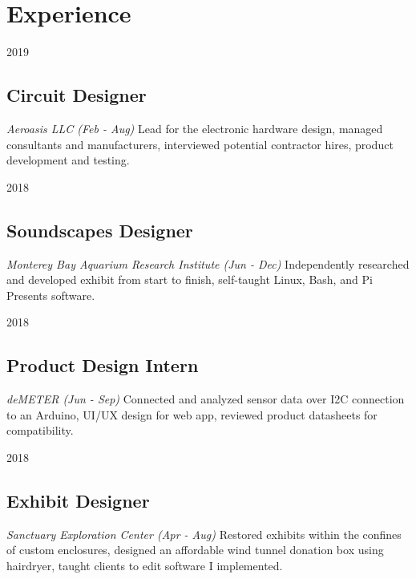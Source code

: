 \documentclass[12pt,letterpaper]{report}
\newcommand{\middlegap}{3.5em}
\newcommand{\verticalgap}{2em}
\newcommand{\leftbody}{0.69\linewidth}
\begin{document}
	\begin{minipage}[t]{\leftbody}
		\vspace{\verticalgap}
	\raggedright
    \section*{Experience}
    \begin{tablist}
    \item[2019] \tab 
    \subsection*{Circuit Designer}
    \textit{Aeroasis LLC (Feb - Aug)} \linebreak 
	Lead for the electronic hardware design, managed consultants and manufacturers, interviewed potential contractor hires, product development and testing.
    \item[2018] \tab
    \subsection*{Soundscapes Designer}
    \textit{Monterey Bay Aquarium Research Institute (Jun - Dec)} \linebreak 
    Independently researched and developed exhibit from start to finish, self-taught Linux, Bash, and Pi Presents software.
    \item[2018] \tab
    \subsection*{Product Design Intern}
    \textit{deMETER (Jun - Sep)} \linebreak 
    Connected and analyzed sensor data over I2C connection to an Arduino, UI/UX design for web app, reviewed product datasheets for compatibility. 
    \item[2018] \tab 
    \subsection*{Exhibit Designer}
	\textit{Sanctuary Exploration Center (Apr - Aug)} \linebreak
	Restored exhibits within the confines of custom enclosures, designed an affordable wind tunnel donation box using hairdryer, taught clients to edit software I implemented.
    \end{tablist}
	\end{minipage}
	\hspace{\middlegap}
\end{document}
